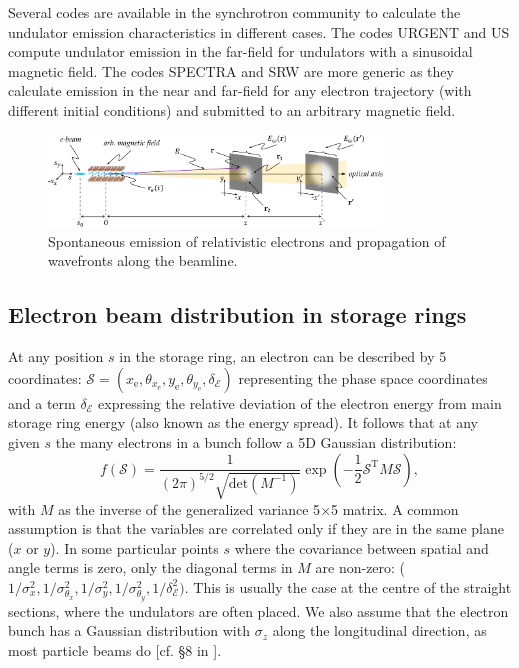 \documentclass{iucr}
\newcommand{\whencolumns}[2]{#1}
\newcommand{\whencolumns}[2]{#2}
\begin{document}
Several codes are available in the synchrotron community to calculate the undulator emission characteristics in different cases. The codes URGENT \cite{codeURGENT} and US \cite{codeUS} compute undulator emission in the far-field for undulators with a sinusoidal magnetic field. The codes SPECTRA \cite{Tanaka2001} and SRW \cite{codeSRW} are more generic as they calculate emission in the near and far-field for any electron trajectory (with different initial conditions) and submitted to an arbitrary magnetic field.

\whencolumns{}{\onecolumn}

\begin{figure}\label{fig:coordinates}
    \centering
    \includegraphics[width=0.79\textwidth]{figures/coordinates.pdf}
    \caption{Spontaneous emission of relativistic electrons and propagation of wavefronts along the beamline.}
\end{figure}


\whencolumns{}{\twocolumn}

\subsection{Electron beam distribution in storage rings}
\label{sec:electronbeam}

At any position $s$ in the storage ring, an electron can be described by 5 coordinates:
$\mathcal{S}= (x_\text{e},\theta_{x_\text{e}},y_\text{e},   \theta_{y_\text{e}},\delta_\mathcal{E})$ representing the phase space coordinates and a term $\delta_\mathcal{E}$ expressing the relative deviation of the electron energy from main storage ring energy (also known as the energy spread). It follows that at any given $s$ the many electrons in a bunch follow a 5D Gaussian distribution:
\begin{equation}\label{eq:f-electrons}
f(\mathcal{S}) = \frac{1}{(2 \pi)^{5/2} \sqrt{\text{det}(M^{-1})}} \exp
        \left( -\frac{1}{2} \mathcal{S}^\text{T} M \mathcal{S} \right),
\end{equation}
with $M$ as the inverse of the generalized variance 5$\times$5 matrix. A common assumption is that the variables are correlated only if they are in the same plane ($x$ or $y$). In some particular points $s$ where the covariance between spatial and angle terms is zero, only the diagonal terms in $M$ are non-zero: ($1/\sigma_x^2,1/\sigma_{\theta_x}^2,1/\sigma_y^2,1/\sigma_{\theta_y}^2,1/\delta_\mathcal{E}^2)$. This is usually the case at the centre of the straight sections, where the undulators are often placed.  We also assume that the electron bunch has a Gaussian distribution with $\sigma_z$ along the longitudinal direction, as most particle beams do [cf. \S8 in \cite{Wiedemann2015}].
 
\end{document}
